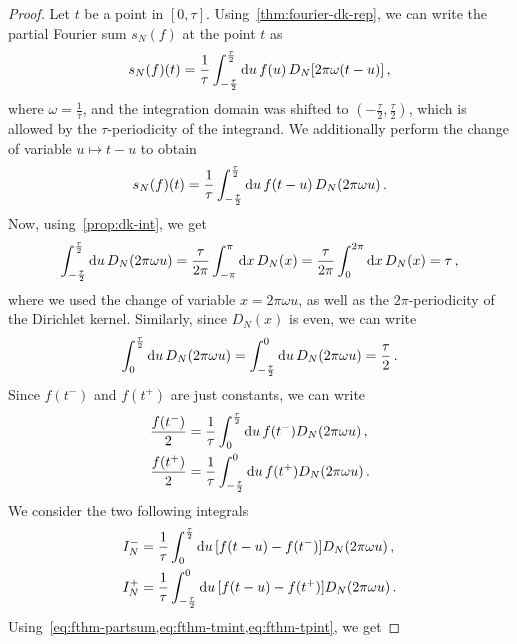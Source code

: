 \begin{proof}
  Let $t$ be a point in $[0,\tau]$. Using~\cref{thm:fourier-dk-rep}, we can write the
  partial Fourier sum $s_N(f)$ at the point $t$ as
  \begin{equation}
    s_N(f)(t)=\frac{1}{\tau}\int_{-\frac{\tau}{2}}^{\frac{\tau}{2}}\mathrm{d} u\,
    f(u)\,D_N[2\pi\omega(t-u)]\,,
  \end{equation}
  where $\omega=\frac{1}{\tau}$, and the integration domain was shifted to
  $(-\frac{\tau}{2},\frac{\tau}{2})$, which is allowed by the $\tau$-periodicity of the
  integrand. We additionally perform the change of variable $u\mapsto t-u$ to obtain
  \begin{equation}
    s_N(f)(t)=\frac{1}{\tau}\int_{-\frac{\tau}{2}}^{\frac{\tau}{2}}\mathrm{d} u\,
    f(t-u)\,D_N(2\pi\omega u)\,.
  \end{equation}
  Now, using~\cref{prop:dk-int}, we get
  \begin{equation}
    \int_{-\frac{\tau}{2}}^{\frac{\tau}{2}}\mathrm{d} u\,D_N(2\pi\omega u)
    =\frac{\tau}{2\pi}\int_{-\pi}^{\pi}\mathrm{d} x\,D_N(x)=
    \frac{\tau}{2\pi}\int_{0}^{2\pi}\mathrm{d} x\,D_N(x)=\tau\,,
    \label{eq:fthm-partsum}
  \end{equation}
  where we used the change of variable $x=2\pi\omega u$, as well as the $2\pi$-periodicity
  of the Dirichlet kernel. Similarly, since $D_N(x)$ is even, we can write
  \begin{equation}
    \int_{0}^{\frac{\tau}{2}}\mathrm{d} u\,D_N(2\pi\omega u)
    =\int_{-\frac{\tau}{2}}^{0}\mathrm{d} u\,D_N(2\pi\omega u)=\frac{\tau}{2}\,.
  \end{equation}
  Since $f(t^-)$ and $f(t^+)$ are just constants, we can write
  \begin{align}
    \frac{f(t^-)}{2}&=\frac{1}{\tau}\int_{0}^{\frac{\tau}{2}}\mathrm{d} u\,
    f(t^-)D_N(2\pi\omega u)\,,
    \label{eq:fthm-tmint}\\
    \frac{f(t^+)}{2}&=\frac{1}{\tau}\int_{-\frac{\tau}{2}}^{0}\mathrm{d} u\,
    f(t^+)D_N(2\pi\omega u)\,.
    \label{eq:fthm-tpint}
  \end{align}
  We consider the two following integrals
  \begin{align}
    I^-_N&=\frac{1}{\tau}\int_{0}^{\frac{\tau}{2}}\mathrm{d} u\,
    [f(t-u)-f(t^-)]D_N(2\pi\omega u)\,,\\
    I^+_N&=\frac{1}{\tau}\int_{-\frac{\tau}{2}}^{0}\mathrm{d} u\,
    [f(t-u)-f(t^+)]D_N(2\pi\omega u)\,.
  \end{align}
  Using~\cref{eq:fthm-partsum,eq:fthm-tmint,eq:fthm-tpint}, we get

\end{proof}

